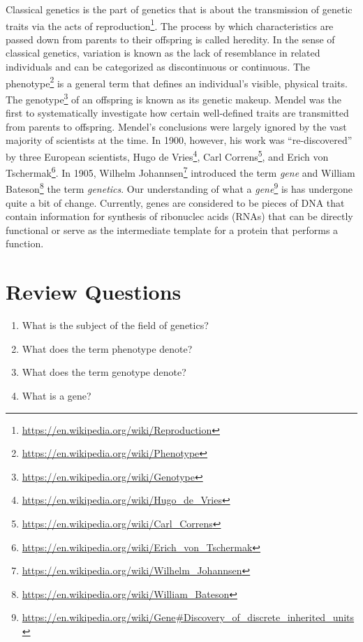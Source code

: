 \documentclass[]{book}
\providecommand{\tightlist}{%
  \setlength{\itemsep}{0pt}\setlength{\parskip}{0pt}}
\let\rmarkdownfootnote\footnote%
\def\footnote{\protect\rmarkdownfootnote}
\renewcommand{\href}[2]{#2\footnote{\url{#1}}}
\begin{document}
Classical genetics is the part of genetics that is about the transmission of genetic traits via the acts of \href{https://en.wikipedia.org/wiki/Reproduction}{reproduction}. The process by which characteristics are passed down from parents to their offspring is called heredity. In the sense of classical genetics, variation is known as the lack of resemblance in related individuals and can be categorized as discontinuous or continuous. The \href{https://en.wikipedia.org/wiki/Phenotype}{phenotype} is a general term that defines an individual's visible, physical traits. The \href{https://en.wikipedia.org/wiki/Genotype}{genotype} of an offspring is known as its genetic makeup. Mendel was the first to systematically investigate how certain well-defined traits are transmitted from parents to offspring. Mendel's conclusions were largely ignored by the vast majority of scientists at the time. In 1900, however, his work was ``re-discovered'' by three European scientists, \href{https://en.wikipedia.org/wiki/Hugo_de_Vries}{Hugo de Vries}, \href{https://en.wikipedia.org/wiki/Carl_Correns}{Carl Correns}, and \href{https://en.wikipedia.org/wiki/Erich_von_Tschermak}{Erich von Tschermak}. In 1905, \href{https://en.wikipedia.org/wiki/Wilhelm_Johannsen}{Wilhelm Johannsen} introduced the term \emph{gene} and \href{https://en.wikipedia.org/wiki/William_Bateson}{William Bateson} the term \emph{genetics}. Our understanding of what a \href{https://en.wikipedia.org/wiki/Gene\#Discovery_of_discrete_inherited_units}{\emph{gene}} is has undergone quite a bit of change. Currently, genes are considered to be pieces of DNA that contain information for synthesis of ribonuclec acids (RNAs) that can be directly functional or serve as the intermediate template for a protein that performs a function.

\hypertarget{review-questions}{%
\section{Review Questions}\label{review-questions}}

\begin{enumerate}
\def\labelenumi{\arabic{enumi}.}
\tightlist
\item
  What is the subject of the field of genetics?
\item
  What does the term phenotype denote?
\item
  What does the term genotype denote?
\item
  What is a gene?
\end{enumerate}
\end{document}
